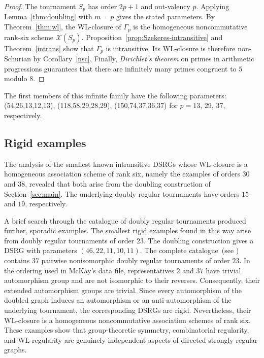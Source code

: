 \documentclass[11pt]{article}
\theoremstyle{definition}
\theoremstyle{remark}
\begin{document}
\begin{proof}
The tournament $S_p$ has order $2p+1$ and out-valency $p$.  Applying
Lemma~\ref{thm:doubling} with $m=p$ gives the stated  parameters.  By
Theorem~\ref{thm:wl}, the WL-closure of $\Gamma_p$ is the
homogeneous noncommutative rank-six scheme $\mathcal X(S_p)$.
Proposition~\ref{prop:Szekeres-intransitive} and
Theorem~\ref{intrans} show that $\Gamma_p$ is
intransitive.  Its WL-closure is therefore non-Schurian by
Corollary~\ref{nsc}.  Finally, \emph{Dirichlet's theorem} on
primes in arithmetic progressions guarantees that there are infinitely many
primes congruent to $5$ modulo $8$.
\end{proof}

The first members of this infinite family have the following parameters:
(54,26,13,12,13), (118,58,29,28,29), (150,74,37,36,37) for 
$p=13$, 29, 37, respectively.  

\subsection{Rigid examples}
\label{rigid}

The analysis of the smallest known intransitive DSRGs whose
WL-closure is a homogeneous association scheme of rank six,
namely the examples of orders $30$ and $38$, revealed that both arise from
the doubling construction of Section~\ref{sec:main}.  The
underlying doubly regular tournaments have orders $15$ and $19$,
respectively.

A brief search through the catalogue of doubly regular tournaments produced
further, sporadic examples.  The smallest rigid examples found in this way
arise from doubly regular tournaments of order $23$.
The doubling construction gives
a DSRG with parameters $(46,22,11,10,11)$.
The complete catalogue~(see \cite{mc}) contains $37$ pairwise nonisomorphic doubly regular
tournaments of order $23$.  In the ordering used in
McKay's data file, representatives $2$ and $37$ have trivial automorphism
group and are not isomorphic to their reverses.  Consequently, their
extended automorphism groups are trivial.  Since every automorphism of the
doubled graph induces an automorphism or an anti-automorphism of the
underlying tournament, the corresponding DSRGs are rigid.  Nevertheless,
their WL-closure is a homogeneous noncommutative association
schemes of rank six. These examples show that group-theoretic symmetry,
combinatorial regularity, and WL-regularity are genuinely independent aspects
of directed strongly regular graphs.
\end{document}
